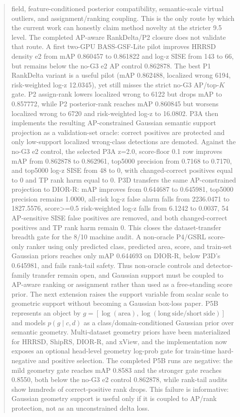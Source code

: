 \documentclass[10pt]{article}
\begin{document}
\begin{abstract}
field, feature-conditioned posterior compatibility, semantic-scale virtual
outliers, and assignment/ranking coupling.  This is the only route by which the
current work can honestly claim method novelty at the stricter 9.5 level.
The completed AP-aware RankDelta/P2 closure does not validate that route.  A
first two-GPU BASS-GSF-Lite pilot improves HRRSD density e2 from mAP 0.860457
to 0.861822 and log-z SISE from 143 to 66, but remains below the no-G3 e2 AP
control 0.862878.  The best P1 RankDelta variant is a useful pilot
(mAP 0.862488, localized wrong 6194, risk-weighted log-z 12.0345), yet still
misses the strict no-G3 AP/top-$K$ gate.  P2 assign-rank lowers localized wrong
to 6122 but drops mAP to 0.857772, while P2 posterior-rank reaches mAP
0.860845 but worsens localized wrong to 6720 and risk-weighted log-z to
16.0802.  P3A then implements the resulting AP-constrained Gaussian semantic
support projection as a validation-set oracle: correct positives are protected
and only low-support localized wrong-class detections are demoted.  Against
the no-G3 e2 control, the selected P3A z=2.0, score-floor 0.1 row improves mAP
from 0.862878 to 0.862961, top5000 precision from 0.7168 to 0.7170, and
top5000 log-z SISE from 48 to 0, with changed-correct positives equal to 0 and
TP rank harm equal to 0.  P3D transfers the same AP-constrained projection to
DIOR-R: mAP improves from 0.644687 to 0.645981, top5000 precision remains
1.0000, all-risk log-z false alarm falls from 2236.0471 to 1827.5576,
score>=0.5 risk-weighted log-z falls from 6.1242 to 0.0037, 54 AP-sensitive
SISE false positives are removed, and both changed-correct positives and TP
rank harm remain 0.  This closes the dataset-transfer breadth gate for the
8/10 machine audit.  A non-oracle P4/GSRL score-only ranker using only
predicted class, predicted area, score, and train-set Gaussian priors reaches
only mAP 0.644693 on DIOR-R, below P3D's 0.645981, and fails rank-tail safety.
Thus non-oracle controls and detector-family transfer remain open, and
Gaussian support must be coupled to AP-aware ranking or assignment rather than
used as a free-standing score prior.
The next extension raises the support variable from scalar scale to geometric
support without becoming a Gaussian box-loss paper.  P5B represents an object
by $g=[\log(\mathrm{area}),\log(\mathrm{long\ side}/\mathrm{short\ side})]$
and models $p(g\mid c,d)$ as a class/domain-conditioned Gaussian prior over
semantic geometry.  Multi-dataset geometry priors have been materialized for
HRRSD, ShipRS, DIOR-R, and xView, and the implementation now exposes an
optional head-level geometry log-prob gate for train-time hard-negative and
positive selection.  The completed P5B runs are negative: the mild geometry
gate reaches mAP 0.8583 and the stronger gate reaches 0.8550, both below the
no-G3 e2 control 0.862878, while rank-tail audits show hundreds of
correct-positive rank drops.  This failure is informative: Gaussian geometry
support is useful only if it is coupled to AP/rank protection, not as an
unconstrained delta loss.
\end{abstract}
\end{document}
